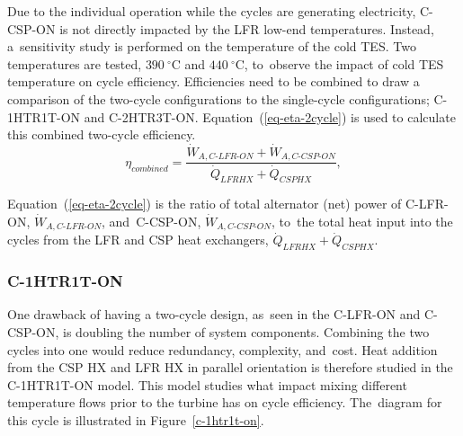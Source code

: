 \documentclass[sustainability,article,accept,moreauthors,pdftex]{Definitions/mdpi}
\begin{document}
\begin{paracol}{2}
\switchcolumn

 Due to the individual operation while the cycles are generating electricity, C-CSP-ON is not directly impacted by the LFR low-end temperatures. Instead, a~sensitivity study is performed on the temperature of the cold TES. Two temperatures are tested, $390~^{\circ}$C and $440~^{\circ}$C, to~observe the impact of cold TES temperature on cycle efficiency. Efficiencies need to be combined to draw a comparison of the two-cycle configurations to the single-cycle configurations; C-1HTR1T-ON and C-2HTR3T-ON. Equation~(\ref{eq-eta-2cycle}) is used to calculate this combined two-cycle efficiency.
\begin{equation}
    \label{eq-eta-2cycle}
    \eta_{combined} = \frac{\dot{W}_{A,C\text{-}LFR\text{-}ON}+\dot{W}_{A,C\text{-}CSP\text{-}ON}}{\dot{Q}_{LFRHX}+\dot{Q}_{CSPHX}},
\end{equation}

Equation~(\ref{eq-eta-2cycle}) is the ratio of total alternator (net) power of C-LFR-ON, $\dot{W}_{A,C\text{-}LFR\text{-}ON}$, and~C-CSP-ON, $\dot{W}_{A,C\text{-}CSP\text{-}ON}$, to~the total heat input into the cycles from the LFR and CSP heat exchangers, $\dot{Q}_{LFRHX}+\dot{Q}_{CSPHX}$.




\subsubsection{C-1HTR1T-ON} 

One drawback of having a two-cycle design, as~seen in the C-LFR-ON and C-CSP-ON, is doubling the number of system components. Combining the two cycles into one would reduce redundancy, complexity, and~cost. Heat addition from the CSP HX and LFR HX in parallel orientation is therefore studied in the C-1HTR1T-ON model. This model studies what impact mixing different temperature flows prior to the turbine has on cycle efficiency. The~diagram for this cycle is illustrated in Figure~\ref{c-1htr1t-on}.
\end{paracol}
\end{document}
